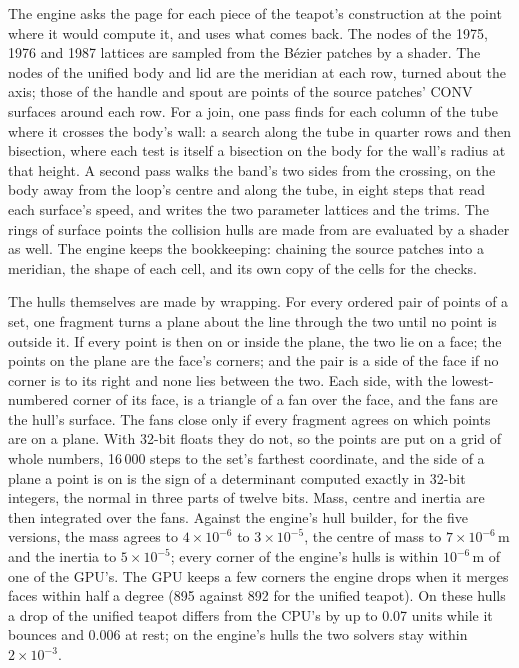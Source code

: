 \documentclass[journal]{IEEEtran}
\begin{document}
The engine asks the page for each piece of the teapot's construction at
the point where it would compute it, and uses what comes back. The
nodes of the 1975, 1976 and 1987 lattices are sampled from the B\'ezier
patches by a shader. The nodes of the unified body and lid are the
meridian at each row, turned about the axis; those of the handle and
spout are points of the source patches' CONV surfaces around each row.
For a join, one pass finds for each column of the tube where it crosses
the body's wall: a search along the tube in quarter rows and then
bisection, where each test is itself a bisection on the body for the
wall's radius at that height. A second pass walks the band's two sides
from the crossing, on the body away from the loop's centre and along the
tube, in eight steps that read each surface's speed, and writes the two
parameter lattices and the trims. The rings of surface points the
collision hulls are made from are evaluated by a shader as well. The
engine keeps the bookkeeping: chaining the source patches into a
meridian, the shape of each cell, and its own copy of the cells for the
checks.

The hulls themselves are made by wrapping. For every ordered pair of
points of a set, one fragment turns a plane about the line through the
two until no point is outside it. If every point is then on or inside
the plane, the two lie on a face; the points on the plane are the
face's corners; and the pair is a side of the face if no corner is to
its right and none lies between the two. Each side, with the
lowest-numbered corner of its face, is a triangle of a fan over the
face, and the fans are the hull's surface. The fans close only if every
fragment agrees on which points are on a plane. With 32-bit floats they
do not, so the points are put on a grid
of whole numbers, 16\,000 steps to the set's farthest coordinate, and
the side of a plane a point is on is the sign of a determinant computed
exactly in 32-bit integers, the normal in three parts of twelve bits.
Mass, centre and inertia are then integrated over the fans. Against the
engine's hull builder, for the five versions, the mass agrees to
$4\times10^{-6}$ to $3\times10^{-5}$, the centre of mass to
$7\times10^{-6}$\,m and the inertia to $5\times10^{-5}$; every corner
of the engine's hulls is within $10^{-6}$\,m of one of the GPU's. The
GPU keeps a few corners the engine drops when it merges faces within
half a degree (895 against 892 for the unified teapot). On these hulls
a drop of the unified teapot differs from the CPU's by up to 0.07 units
while it bounces and 0.006 at rest; on the engine's hulls the two
solvers stay within $2\times10^{-3}$.
\end{document}
